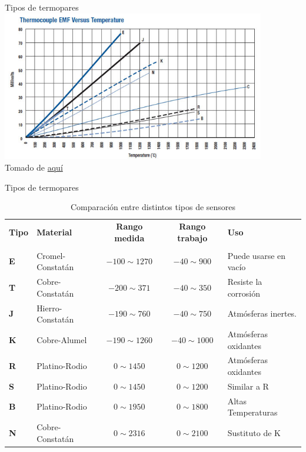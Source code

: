\documentclass[aspectratio=169]{beamer}
\begin{document}
\begin{frame}{Tipos de termopares}
\centering
    \includegraphics[width=11.5cm]{fig/Thermocouple_EMF_Temperature.png}
     \\ \tiny{Tomado de \href{https://www.akcp.com/blog/what-is-a-k-type-thermocouple/}{aquí}}
\end{frame}
\begin{frame}{Tipos de termopares}
  \begin{table}[]
    \centering
    \footnotesize{
    \begin{tabular}{m{0.6cm} m{3.4cm} c c m{3.8cm}}
        \toprule
        \textbf{Tipo} & \textbf{Material} &\textbf{Rango medida} & \textbf{Rango trabajo} & \textbf{Uso} \\
        &  &  \centering[\si{\celsius}] & \centering[\si{\celsius}] & \\
        \midrule
        \textbf{E} & Cromel-Constatán & $-100\sim 1270$ & $-40\sim 900$ & Puede usarse en vacío\\
        \textbf{T} & Cobre-Constatán & $-200\sim  371$ & $-40\sim 350$ & Resiste la corrosión\\
        \textbf{J} & Hierro-Constatán & $-190\sim  760$ & $-40\sim 750$ & Atmósferas inertes.\\
        \textbf{K} & Cobre-Alumel & $-190\sim  1260$ & $-40\sim 1000$ & Atmósferas oxidantes\\
        \textbf{R} & Platino-Rodio & $0\sim  1450$ & $0\sim 1200$ & Atmósferas oxidantes\\
        \textbf{S} & Platino-Rodio & $0\sim  1450$ & $0\sim 1200$ & Similar a R\\
        \textbf{B} & Platino-Rodio & $0\sim  1950$ & $0\sim 1800$ & Altas Temperaturas\\
        \textbf{N} & Cobre-Constatán & $0\sim  2316$ & $0\sim 2100$ & Sustituto de K\\
        \bottomrule
    \end{tabular}
    }
    \caption{Comparación entre distintos tipos de sensores\cite{sole2005instrumentacion}}
    \label{tab:Comparacion_termo}
\end{table}
\end{frame}
\end{document}
